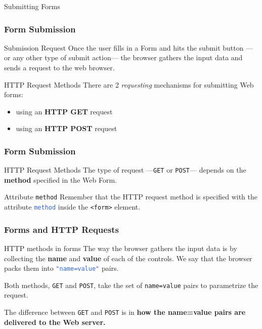 \documentclass{beamer}\usepackage[]{graphicx}\usepackage[]{color}
\newcommand{\code}[1]{\texttt{#1}}
\newcommand{\highcode}[1]{\textcolor{highlight}{\texttt{#1}}}
\begin{document}
\begin{frame}
 \begin{center}
  \Huge{\textcolor{mandarina}{Submitting Forms}}
 \end{center}
\end{frame}


\begin{frame}
\frametitle{Form Submission}

\begin{block}{Submission Request}
Once the user fills in a Form and hits the submit button ---or any other type of submit action--- the browser gathers the input data and sends a request to the web browser. 
\end{block}

\begin{block}{HTTP Request Methods}
There are 2 \textit{requesting} mechanisms for submitting Web forms: 
\begin{itemize}
 \item using an \textbf{HTTP GET} request
 \item using an \textbf{HTTP POST} request
\end{itemize}
\end{block}

\end{frame}


\begin{frame}
\frametitle{Form Submission}

\begin{block}{HTTP Request Methods}
The type of request ---\code{GET} or \code{POST}--- depends on the \textbf{method} specified in the Web Form.
\end{block}

\begin{block}{Attribute \code{method}}
Remember that the HTTP request method is specified with the attribute \highcode{method} inside the \code{<form>} element.  
\end{block}

\end{frame}


\begin{frame}
\frametitle{Forms and HTTP Requests}

\begin{block}{HTTP methods in forms}
The way the browser gathers the input data is by collecting the \textbf{name} and \textbf{value} of each of the controls. We say that the browser packs them into \highcode{"name=value"} pairs.

\bigskip
Both methods, \code{GET} and \code{POST}, take the set of \code{name=value} pairs to parametrize the request.

\bigskip
The difference between \code{GET} and \code{POST} is in \textbf{how the name=value pairs are delivered to the Web server.}
\end{block}

\end{frame}
\end{document}
